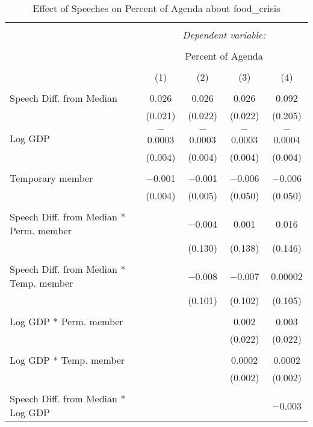 
\begin{table}[!htbp] \centering 
  \caption{Effect of Speeches on Percent of Agenda about  food_crisis} 
  \label{} 
\begin{tabular}{@{\extracolsep{5pt}}lcccc} 
\\[-1.8ex]\hline 
\hline \\[-1.8ex] 
 & \multicolumn{4}{c}{\textit{Dependent variable:}} \\ 
\cline{2-5} 
\\[-1.8ex] & \multicolumn{4}{c}{Percent of Agenda} \\ 
\\[-1.8ex] & (1) & (2) & (3) & (4)\\ 
\hline \\[-1.8ex] 
 Speech Diff. from Median & 0.026 & 0.026 & 0.026 & 0.092 \\ 
  & (0.021) & (0.022) & (0.022) & (0.205) \\ 
  & & & & \\ 
 Log GDP & $-$0.0003 & $-$0.0003 & $-$0.0003 & $-$0.0004 \\ 
  & (0.004) & (0.004) & (0.004) & (0.004) \\ 
  & & & & \\ 
 Temporary member & $-$0.001 & $-$0.001 & $-$0.006 & $-$0.006 \\ 
  & (0.004) & (0.005) & (0.050) & (0.050) \\ 
  & & & & \\ 
 Speech Diff. from Median * Perm. member &  & $-$0.004 & 0.001 & 0.016 \\ 
  &  & (0.130) & (0.138) & (0.146) \\ 
  & & & & \\ 
 Speech Diff. from Median * Temp. member &  & $-$0.008 & $-$0.007 & 0.00002 \\ 
  &  & (0.101) & (0.102) & (0.105) \\ 
  & & & & \\ 
 Log GDP * Perm. member &  &  & 0.002 & 0.003 \\ 
  &  &  & (0.022) & (0.022) \\ 
  & & & & \\ 
 Log GDP * Temp. member &  &  & 0.0002 & 0.0002 \\ 
  &  &  & (0.002) & (0.002) \\ 
  & & & & \\ 
 Speech Diff. from Median * Log GDP &  &  &  & $-$0.003 \\ 

\end{tabular}
\end{table}
